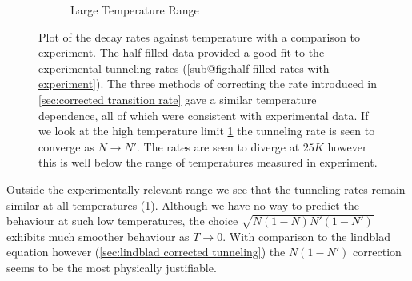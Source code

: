 \begin{figure}[htbp]
\begin{subfigure}{0.45\linewidth}
        \caption{Large Temperature Range
        }\label{sub@fig:simulation temperature dependence comparison}
    \end{subfigure}
    \caption{Plot of the decay rates
        against temperature with a comparison
        to experiment. The half
        filled data provided a good
        fit to the experimental
        tunneling rates
        (\cref{sub@fig:half filled rates with experiment}).
        The three methods of correcting
        the rate introduced in
        \cref{sec:corrected transition rate}
        gave a similar temperature
        dependence, all of which were consistent
        with experimental
        data. If we look at
        the high temperature
        limit
        \cref{sub@fig:simulation temperature dependence comparison}
        the tunneling
        rate is seen to converge
        as \(N\rightarrow{}N'\).
        The rates are seen to diverge
        at \(25K\) however this is well
        below the range of temperatures
        measured in experiment.
    }\label{fig:simulation-experiment comparison}
\end{figure}

Outside the experimentally
relevant range we see that the
tunneling rates remain
similar at all temperatures
(\cref{sub@fig:simulation temperature dependence comparison}).
Although we have no way
to predict the behaviour at
such low temperatures, the
choice \(\sqrt{N(1-N)N'(1-N')}\)
exhibits much smoother
behaviour as \(T\rightarrow{}0\).
With comparison to the lindblad
equation however
(\cref{sec:lindblad corrected tunneling})
the \(N(1-N')\)
correction seems to be the
most physically justifiable.



